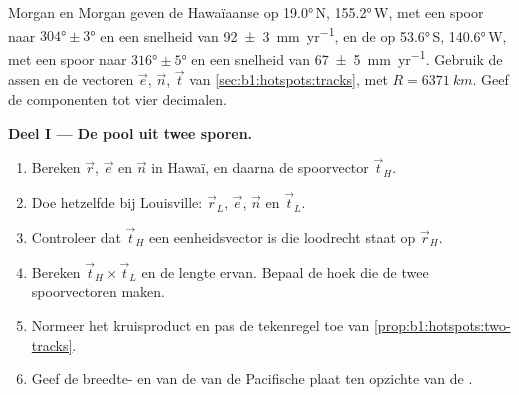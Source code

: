 \begin{problem}
\label{pb:b1:hotspots:1}
Morgan en Morgan geven de Hawaïaanse  op \ang{19.0}\,N, \ang{155.2}\,W, met een spoor naar $\ang{304}\pm\ang{3}$ en een snelheid van \qty[uncertainty-mode=separate]{92 \pm 3}{mm.yr^{-1}}, en de  op \ang{53.6}\,S, \ang{140.6}\,W, met een spoor naar $\ang{316}\pm\ang{5}$ en een snelheid van \qty[uncertainty-mode=separate]{67 \pm 5}{mm.yr^{-1}}. Gebruik de assen en de vectoren $\vec e$, $\vec n$, $\vec t$ van \cref{sec:b1:hotspots:tracks}, met $R = \qty{6371}{km}$. Geef de componenten tot vier decimalen.

\medskip
\noindent\textbf{Deel I --- De pool uit twee sporen.}
\begin{enumerate}
  \item Bereken $\vec r$, $\vec e$ en $\vec n$ in Hawaï, en daarna de spoorvector
        $\vec t_H$.
  \item Doe hetzelfde bij Louisville: $\vec r_L$, $\vec e$, $\vec n$ en
        $\vec t_L$.
  \item Controleer dat $\vec t_H$ een eenheidsvector is die loodrecht staat op $\vec r_H$.
  \item Bereken $\vec t_H\times\vec t_L$ en de lengte ervan. Bepaal de hoek die de twee
        spoorvectoren maken.
  \item Normeer het kruisproduct en pas de tekenregel toe van
        \cref{prop:b1:hotspots:two-tracks}.
  \item Geef de breedte- en  van de  van de Pacifische plaat
        ten opzichte van de .
\end{enumerate}


\end{problem}

